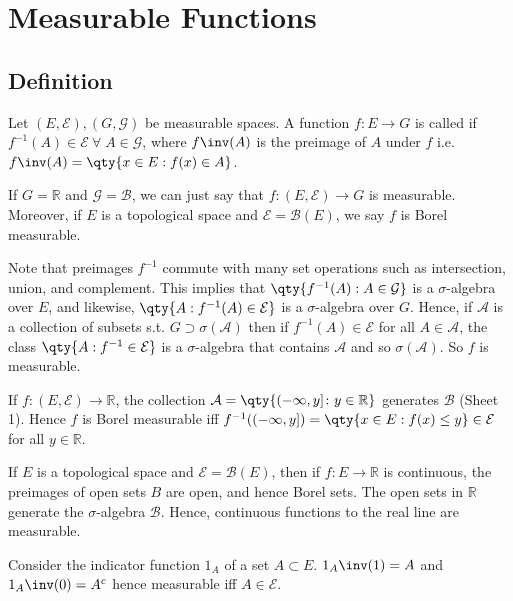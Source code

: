 \section{Measurable Functions}
\subsection{Definition}
\begin{definition}[Measurable]
	Let $(E, \mathcal E), (G, \mathcal G)$ be measurable spaces.
	A function $f \colon E \to G$ is called  if $f^{-1}(A) \in \mathcal E \ \forall \; A \in \mathcal{G}$, where $f\inv(A)$ is the preimage of $A$ under $f$ i.e. $f\inv(A) = \qty{x \in E : f(x) \in A}$.
\end{definition}

If $G = \mathbb R$ and $\mathcal G = \mathcal B$, we can just say that $f \colon (E, \mathcal E) \to G$ is measurable.
Moreover, if $E$ is a topological space and $\mathcal E = \mathcal B(E)$, we say $f$ is Borel measurable.

Note that preimages $f^{-1}$ commute with many set operations such as intersection, union, and complement.
This implies that $\qty{f^{-1}(A) : A \in \mathcal G}$ is a $\sigma$-algebra over $E$, and likewise, $\qty{A : f^{-1}(A) \in \mathcal E}$ is a $\sigma$-algebra over $G$.
Hence, if $\mathcal A$ is a collection of subsets s.t. $G \supset \sigma(\mathcal{A})$ then if $f^{-1}(A) \in \mathcal E$ for all $A \in \mathcal A$, the class $\qty{A : f^{-1} \in \mathcal E}$ is a $\sigma$-algebra that contains $\mathcal A$ and so $\sigma(\mathcal{A})$.
So $f$ is measurable.

If $f \colon (E, \mathcal E) \to \mathbb R$, the collection $\mathcal A = \qty{(-\infty,y] \colon y \in \mathbb R}$ generates $\mathcal B$ (Sheet 1).
Hence $f$ is Borel measurable iff $f^{-1}((-\infty,y]) = \qty{x \in E : f(x) \leq y} \in \mathcal E$ for all $y \in \mathbb R$.

If $E$ is a topological space and $\mathcal E = \mathcal B(E)$, then if $f \colon E \to \mathbb R$ is continuous, the preimages of open sets $B$ are open, and hence Borel sets.
The open sets in $\mathbb R$ generate the $\sigma$-algebra $\mathcal B$.
Hence, continuous functions to the real line are measurable.

\begin{example}
	Consider the indicator function $1_A$ of a set $A \subset E$. $1_A\inv(1) = A$ and $1_A\inv(0) = A^c$ hence measurable iff $A \in \mathcal E$.
\end{example}

